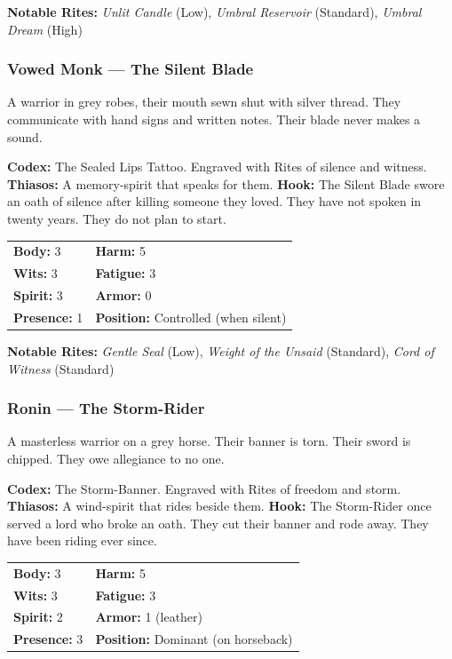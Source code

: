 \textbf{Notable Rites:} \textit{Unlit Candle} (Low), \textit{Umbral Reservoir} (Standard), \textit{Umbral Dream} (High)

\subsubsection{Vowed Monk — The Silent Blade}

A warrior in grey robes, their mouth sewn shut with silver thread. They communicate with hand signs and written notes. Their blade never makes a sound.

\textbf{Codex:} The Sealed Lips Tattoo. Engraved with Rites of silence and witness.
\textbf{Thiasos:} A memory-spirit that speaks for them.
\textbf{Hook:} The Silent Blade swore an oath of silence after killing someone they loved. They have not spoken in twenty years. They do not plan to start.

\begin{tabular}{ll}
\textbf{Body:} 3 & \textbf{Harm:} 5 \\
\textbf{Wits:} 3 & \textbf{Fatigue:} 3 \\
\textbf{Spirit:} 3 & \textbf{Armor:} 0 \\
\textbf{Presence:} 1 & \textbf{Position:} Controlled (when silent) \\
\end{tabular}

\textbf{Notable Rites:} \textit{Gentle Seal} (Low), \textit{Weight of the Unsaid} (Standard), \textit{Cord of Witness} (Standard)

\subsubsection{Ronin — The Storm-Rider}

A masterless warrior on a grey horse. Their banner is torn. Their sword is chipped. They owe allegiance to no one.

\textbf{Codex:} The Storm-Banner. Engraved with Rites of freedom and storm.
\textbf{Thiasos:} A wind-spirit that rides beside them.
\textbf{Hook:} The Storm-Rider once served a lord who broke an oath. They cut their banner and rode away. They have been riding ever since.

\begin{tabular}{ll}
\textbf{Body:} 3 & \textbf{Harm:} 5 \\
\textbf{Wits:} 3 & \textbf{Fatigue:} 3 \\
\textbf{Spirit:} 2 & \textbf{Armor:} 1 (leather) \\
\textbf{Presence:} 3 & \textbf{Position:} Dominant (on horseback) \\
\end{tabular}

